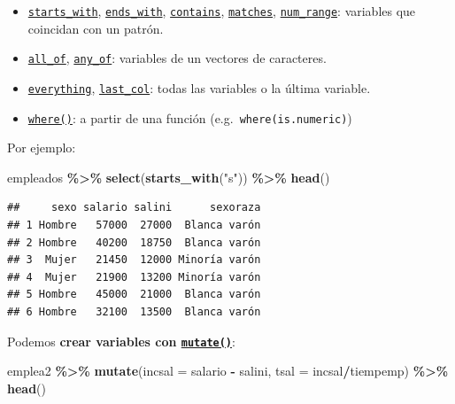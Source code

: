 \documentclass[
]{book}
\newenvironment{Shaded}{\begin{snugshade}}{\end{snugshade}}
\newcommand{\AttributeTok}[1]{\textcolor[rgb]{0.13,0.29,0.53}{#1}}
\newcommand{\FunctionTok}[1]{\textcolor[rgb]{0.13,0.29,0.53}{\textbf{#1}}}
\newcommand{\NormalTok}[1]{#1}
\newcommand{\SpecialCharTok}[1]{\textcolor[rgb]{0.81,0.36,0.00}{\textbf{#1}}}
\newcommand{\StringTok}[1]{\textcolor[rgb]{0.31,0.60,0.02}{#1}}
\theoremstyle{break}
\theoremstyle{nonumberplain}
\begin{document}
\begin{itemize}
\item
  \href{https://tidyselect.r-lib.org/reference/starts_with.html}{\texttt{starts\_with}}, \href{https://tidyselect.r-lib.org/reference/starts_with.html}{\texttt{ends\_with}}, \href{https://tidyselect.r-lib.org/reference/starts_with.html}{\texttt{contains}}, \href{https://tidyselect.r-lib.org/reference/starts_with.html}{\texttt{matches}}, \href{https://tidyselect.r-lib.org/reference/starts_with.html}{\texttt{num\_range}}: variables que coincidan con un patrón.
\item
  \href{https://tidyselect.r-lib.org/reference/all_of.html}{\texttt{all\_of}}, \href{https://tidyselect.r-lib.org/reference/all_of.html}{\texttt{any\_of}}: variables de un vectores de caracteres.
\item
  \href{https://tidyselect.r-lib.org/reference/everything.html}{\texttt{everything}}, \href{https://tidyselect.r-lib.org/reference/everything.html}{\texttt{last\_col}}: todas las variables o la última variable.
\item
  \href{https://tidyselect.r-lib.org/reference/where.html}{\texttt{where()}}: a partir de una función (e.g.~\texttt{where(is.numeric)})
\end{itemize}

Por ejemplo:

\begin{Shaded}
\begin{Highlighting}[]
\NormalTok{empleados }\SpecialCharTok{\%\textgreater{}\%} \FunctionTok{select}\NormalTok{(}\FunctionTok{starts\_with}\NormalTok{(}\StringTok{"s"}\NormalTok{)) }\SpecialCharTok{\%\textgreater{}\%} \FunctionTok{head}\NormalTok{()}
\end{Highlighting}
\end{Shaded}

\begin{verbatim}
##     sexo salario salini      sexoraza
## 1 Hombre   57000  27000  Blanca varón
## 2 Hombre   40200  18750  Blanca varón
## 3  Mujer   21450  12000 Minoría varón
## 4  Mujer   21900  13200 Minoría varón
## 5 Hombre   45000  21000  Blanca varón
## 6 Hombre   32100  13500  Blanca varón
\end{verbatim}

Podemos \textbf{crear variables con \href{https://dplyr.tidyverse.org/reference/mutate.html}{\texttt{mutate()}}}:

\begin{Shaded}
\begin{Highlighting}[]
\NormalTok{emplea2 }\SpecialCharTok{\%\textgreater{}\%} \FunctionTok{mutate}\NormalTok{(}\AttributeTok{incsal =}\NormalTok{ salario }\SpecialCharTok{{-}}\NormalTok{ salini, }\AttributeTok{tsal =}\NormalTok{ incsal}\SpecialCharTok{/}\NormalTok{tiempemp) }\SpecialCharTok{\%\textgreater{}\%} \FunctionTok{head}\NormalTok{()}
\end{Highlighting}
\end{Shaded}
\end{document}
